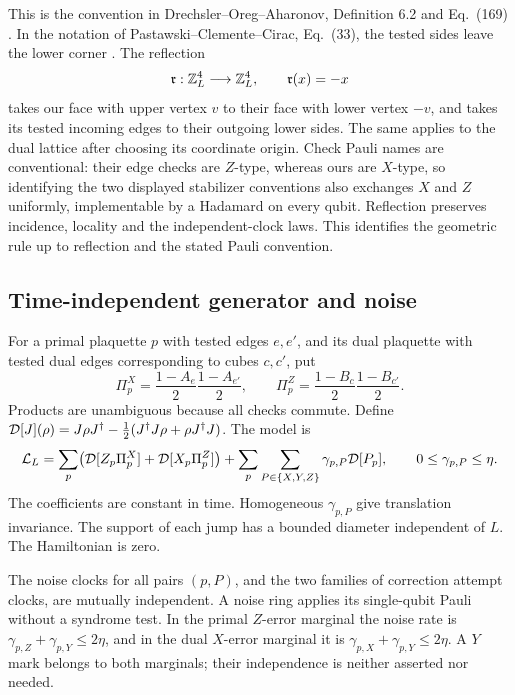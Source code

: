 This is the convention in Drechsler--Oreg--Aharonov,
Definition 6.2 and Eq.~(169) \cite{DOA}. In the notation of
Pastawski--Clemente--Cirac, Eq.~(33), the tested sides leave the lower
corner \cite{PCC}. The reflection
\begin{equation}\label{eq:reflection}
 \mathfrak r:\mathbb Z_L^4\longrightarrow\mathbb Z_L^4,\qquad
             \mathfrak r(x)=-x
\end{equation}
takes our face with upper vertex \(v\) to their face with lower vertex
\(-v\), and takes its tested incoming edges to their outgoing lower
sides. The same applies to the dual lattice after choosing its
coordinate origin. Check Pauli names are conventional: their edge
checks are \(Z\)-type, whereas ours are \(X\)-type, so identifying the
two displayed stabilizer conventions also exchanges \(X\) and \(Z\)
uniformly, implementable by a Hadamard on every qubit. Reflection
preserves incidence, locality and the independent-clock laws. This
identifies the geometric rule up to reflection and the stated Pauli
convention.

\subsection{Time-independent generator and noise}

For a primal plaquette \(p\) with tested edges \(e,e'\), and its dual
plaquette with tested dual edges corresponding to cubes \(c,c'\), put
\begin{equation}
 \Pi_p^X=\frac{1-A_e}{2}\frac{1-A_{e'}}{2},\qquad
 \Pi_p^Z=\frac{1-B_c}{2}\frac{1-B_{c'}}{2}.
\end{equation}
Products are unambiguous because all checks commute. Define
\(\mathcal D[J](\rho)=J\rho J^\dagger-
\frac12(J^\dagger J\rho+\rho J^\dagger J)\). The model is
\begin{equation}\label{eq:generator}
 \mathcal L_L=
 \sum_p\bigl(\mathcal D[Z_p\Pi_p^X]+\mathcal D[X_p\Pi_p^Z]\bigr)
 +\sum_p\sum_{P\in\{X,Y,Z\}}\gamma_{p,P}\mathcal D[P_p],
 \qquad 0\le\gamma_{p,P}\le\eta .
\end{equation}
The coefficients are constant in time. Homogeneous \(\gamma_{p,P}\)
give translation invariance. The support of each jump has a bounded
diameter independent of \(L\). The Hamiltonian is zero.

The noise clocks for all pairs \((p,P)\), and the two families of
correction attempt clocks, are mutually independent. A noise ring
applies its single-qubit Pauli without a syndrome test. In the primal
\(Z\)-error marginal the noise rate is \(\gamma_{p,Z}+\gamma_{p,Y}\le
2\eta\), and in the dual \(X\)-error marginal it is
\(\gamma_{p,X}+\gamma_{p,Y}\le2\eta\). A \(Y\) mark belongs to both
marginals; their independence is neither asserted nor needed.

